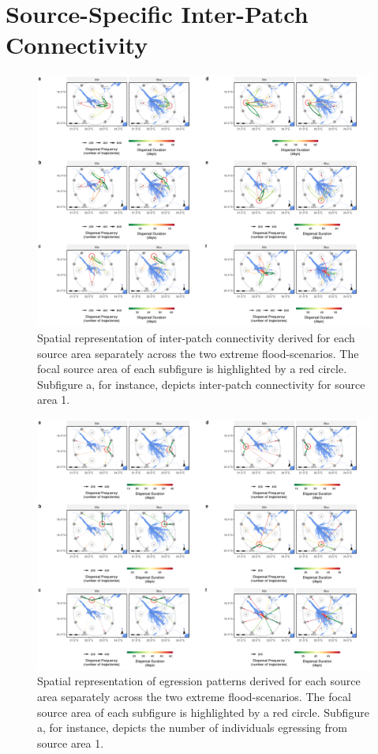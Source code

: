 \documentclass[../FinalThesis.tex]{subfiles}
\begin{document}
\section{Source-Specific Inter-Patch Connectivity}
\begin{figure}[!ht]
  \begin{center}
  \includegraphics[width = \textwidth]{Figures/IPCMain.png}
  \caption{Spatial representation of inter-patch connectivity derived for each
  source area separately across the two extreme flood-scenarios. The focal
  source area of each subfigure is highlighted by a red circle. Subfigure a, for
  instance, depicts inter-patch connectivity for source area 1.}
  \label{IPCMain}
  \end{center}
\end{figure}

\newpage
\begin{figure}[!ht]
  \begin{center}
  \includegraphics[width = \textwidth]{Figures/IPCBuffer.png}
  \caption{Spatial representation of egression patterns derived for each source
  area separately across the two extreme flood-scenarios. The focal source area
  of each subfigure is highlighted by a red circle. Subfigure a, for instance,
  depicts the number of individuals egressing from source area 1.}
  \label{IPCBuffer}
  \end{center}
\end{figure}
\end{document}
